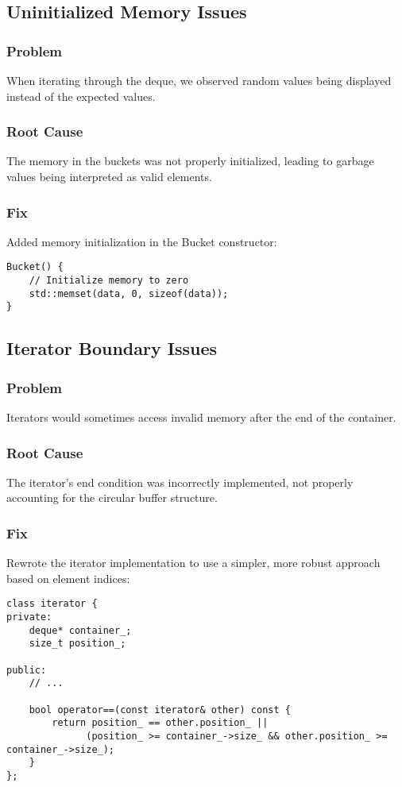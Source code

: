 \documentclass[a4paper,12pt]{article}
\begin{document}
\subsection{Uninitialized Memory Issues}
\subsubsection{Problem}
When iterating through the deque, we observed random values being displayed instead of the expected values.

\subsubsection{Root Cause}
The memory in the buckets was not properly initialized, leading to garbage values being interpreted as valid elements.

\subsubsection{Fix}
Added memory initialization in the Bucket constructor:

\begin{lstlisting}
Bucket() {
    // Initialize memory to zero
    std::memset(data, 0, sizeof(data));
}
\end{lstlisting}

\subsection{Iterator Boundary Issues}
\subsubsection{Problem}
Iterators would sometimes access invalid memory after the end of the container.

\subsubsection{Root Cause}
The iterator's end condition was incorrectly implemented, not properly accounting for the circular buffer structure.

\subsubsection{Fix}
Rewrote the iterator implementation to use a simpler, more robust approach based on element indices:

\begin{lstlisting}
class iterator {
private:
    deque* container_;
    size_t position_;
    
public:
    // ...
    
    bool operator==(const iterator& other) const {
        return position_ == other.position_ || 
              (position_ >= container_->size_ && other.position_ >= container_->size_);
    }
};
\end{lstlisting}
\end{document}

